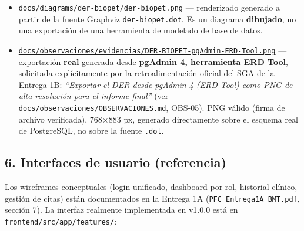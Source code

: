 \documentclass[
  spanish,
]{article}
\providecommand{\tightlist}{%
  \setlength{\itemsep}{0pt}\setlength{\parskip}{0pt}}
\begin{document}
\begin{itemize}
\tightlist
\item
  \texttt{docs/\allowbreak{}diagrams/\allowbreak{}der-\allowbreak{}biopet/\allowbreak{}der-\allowbreak{}biopet.\allowbreak{}png} --- renderizado
  generado a partir de la fuente Graphviz \texttt{der-\allowbreak{}biopet.\allowbreak{}dot}. Es un
  diagrama \textbf{dibujado}, no una exportación de una herramienta de
  modelado de base de datos.
\item
  \href{../observaciones/evidencias/DER-BIOPET-pgAdmin-ERD-Tool.png}{\texttt{docs/\allowbreak{}observaciones/\allowbreak{}evidencias/\allowbreak{}DER-\allowbreak{}BIOPET-\allowbreak{}pg\allowbreak{}Admin-\allowbreak{}ERD-\allowbreak{}Tool.\allowbreak{}png}}
  --- exportación \textbf{real} generada desde \textbf{pgAdmin 4,
  herramienta ERD Tool}, solicitada explícitamente por la
  retroalimentación oficial del SGA de la Entrega 1B: \emph{``Exportar
  el DER desde pgAdmin 4 (ERD Tool) como PNG de alta resolución para el
  informe final''} (ver \texttt{docs/\allowbreak{}observaciones/\allowbreak{}OBSERVACIONES.\allowbreak{}md},
  OBS-05). PNG válido (firma de archivo verificada), 768×883 px,
  generado directamente sobre el esquema real de PostgreSQL, no sobre la
  fuente \texttt{.\allowbreak{}dot}.
\end{itemize}

\subsection{6. Interfaces de usuario
(referencia)}\label{interfaces-de-usuario-referencia}

Los wireframes conceptuales (login unificado, dashboard por rol,
historial clínico, gestión de citas) están documentados en la Entrega 1A
(\texttt{PFC\_\allowbreak{}Entrega1\allowbreak{}A\_\allowbreak{}BMT.\allowbreak{}pdf}, sección 7). La interfaz realmente
implementada en v1.0.0 está en \texttt{frontend/\allowbreak{}src/\allowbreak{}app/\allowbreak{}features/}:
\end{document}
